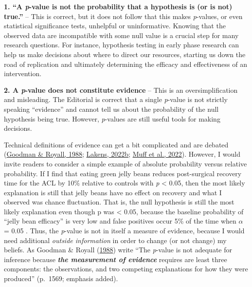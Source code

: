 \documentclass[]{cik}%
\begin{document}
\textbf{1. ``A \emph{p}-value is not the probability that a hypothesis
is (or is not) true.''} -- This is correct, but it does not follow that
this makes \emph{p}-values, or even statistical significance tests,
unhelpful or uninformative. Knowing that the observed data are
incompatible with some null value is a crucial step for many research
questions. For instance, hypothesis testing in early phase research can
help us make decisions about where to direct our resources, starting us
down the road of replication and ultimately determining the efficacy and
effectiveness of an intervention.

\textbf{2. A \emph{p}-value does not constitute evidence} -- This is an
oversimplification and misleading. The Editorial is correct that a
single \emph{p}-value is not strictly speaking ``evidence'' and cannot
tell us about the probability of the null hypothesis being true.
However, \emph{p}-values are still useful tools for making decisions.

Technical definitions of evidence can get a bit complicated and are
debated (\protect\hyperlink{ref-9}{Goodman \& Royall, 1988};
\protect\hyperlink{ref-7}{Lakens, 2022b}; \protect\hyperlink{ref-8}{Muff
et al., 2022}). However, I would invite readers to consider a simple
example of absolute probability versus relative probability. If I find
that eating green jelly beans reduces post-surgical recovery time for
the ACL by 10\% relative to controls with \emph{p} \textless{} 0.05,
then the most likely explanation is still that jelly beans have no
effect on recovery and what I observed was chance fluctuation. That is,
the null hypothesis is still the most likely explanation even though p
was \textless{} 0.05, because the baseline probability of ``jelly bean
efficacy'' is very low and false positives occur 5\% of the time when
\(\alpha\) = 0.05 . Thus, the \emph{p}-value is not in itself a measure
of evidence, because I would need additional \emph{outside information}
in order to change (or not change) my beliefs. As Goodman \& Royall
(\protect\hyperlink{ref-9}{1988}) write ``The \emph{p}-value is not
adequate for inference because \textbf{\emph{the measurement of
evidence}} requires are least three components: the observations, and
two competing explanations for how they were produced'' (p.~1569;
emphasis added).
\end{document}
